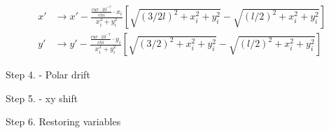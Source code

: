 \documentclass[english]{article}
\begin{document}
 \begin{align}
     x' &\to x' - \frac{\frac{cur\cdot10^{-7}}{chi}\cdot x_i}{x_i^2+y_i^2}
     \left[\sqrt{(3/2 l)^2+x_i^2+y_i^2}-\sqrt{(l/2)^2+x_i^2+y_i^2} \right] \\
     y' &\to y' - \frac{\frac{cur\cdot10^{-7}}{chi}\cdot y_i}{x_i^2+y_i^2}
     \left[\sqrt{(3/2)^2+x_i^2+y_i^2}-\sqrt{(l/2)^2+x_i^2+y_i^2} \right]
\end{align}

  
 Step 4. - Polar drift
 
 Step 5. - xy shift

 Step 6. Restoring variables 
 
 
 



\end{document}
